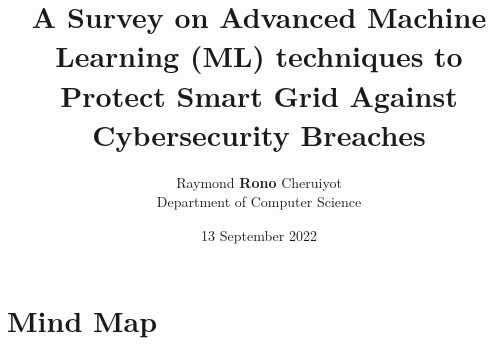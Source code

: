 \documentclass[a4paper]{article}
\title{A Survey on Advanced Machine Learning (ML) techniques to Protect Smart Grid Against Cybersecurity Breaches }
\author{Raymond \textbf {Rono} Cheruiyot \\ Department of Computer Science}
\date{13 September 2022}
\begin{document}
\maketitle
\tableofcontents
\section{Mind Map}




\nocite{Foroutan_undated-ig}
\nocite{Karimipour2017-tj}
\nocite{Rahman2013-pu}
\nocite{Zhang2019-eu}

%
\printbibliography
\end{document}
